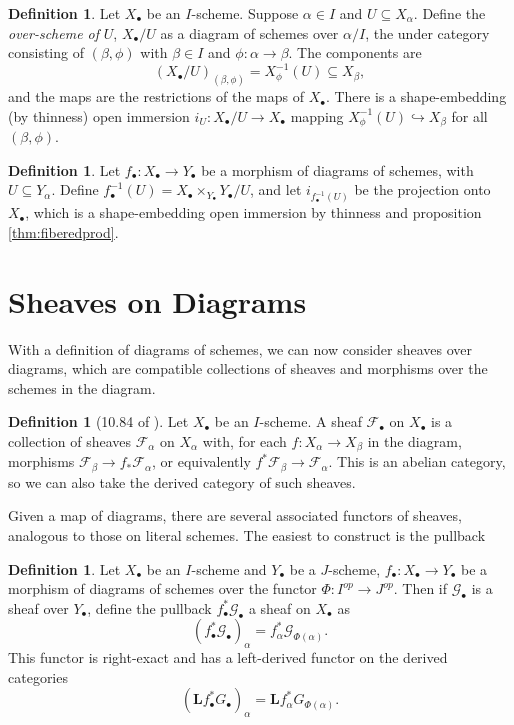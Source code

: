 \documentclass{report}
\theoremstyle{definition}
\newtheorem{definition}[theorem]{Definition}
\newcommand{\FF}{\mathscr{F}}
\newcommand{\GG}{\mathscr{G}}
\newcommand{\bL}{\textbf{L}}
\begin{document}
\begin{definition}
	Let $X_\bullet$ be an $I$-scheme.
	Suppose $\alpha \in I$ and $U \subseteq X_\alpha$.
	Define the {\it over-scheme of} $U$, $X_\bullet/U$ as a diagram of schemes over $\alpha/I$, the under category consisting of $(\beta, \phi)$ with $\beta \in I$ and $\phi : \alpha \rightarrow \beta$.
	The components are
	\[
	(X_\bullet/U)_{(\beta, \phi)} = X_\phi^{-1} (U) \subseteq X_\beta,
	\]
	and the maps are the restrictions of the maps of $X_\bullet$.
	There is a shape-embedding (by thinness) open immersion $i_U : X_\bullet / U \rightarrow X_\bullet$ mapping $X_\phi^{-1}(U) \hookrightarrow X_\beta$ for all $(\beta, \phi)$.
\end{definition}

\begin{definition}
	\label{def:diagrampreimage}
	Let $f_\bullet : X_\bullet \rightarrow Y_\bullet$ be a morphism of diagrams of schemes, with $U \subseteq Y_\alpha$.
	Define $f_\bullet^{-1}(U) = X_\bullet \times_{Y_\bullet} Y_\bullet / U$, and let $i_{f_\bullet^{-1} (U)}$ be the projection onto $X_\bullet$, which is a shape-embedding open immersion by thinness and proposition \ref{thm:fiberedprod}.
\end{definition}

\section{Sheaves on Diagrams}
With a definition of diagrams of schemes, we can now consider sheaves over diagrams, which are compatible collections of sheaves and morphisms over the schemes in the diagram.

\begin{definition}[10.84 of \cite{Kollar2013}]
	Let $X_\bullet$ be an $I$-scheme.
	A sheaf $\FF_\bullet$ on $X_\bullet$ is a collection of sheaves $\FF_\alpha$ on $X_\alpha$ with, for each $f : X_\alpha \rightarrow X_\beta$ in the diagram, morphisms $\FF_\beta \rightarrow f_* \FF_\alpha$, or equivalently $f^* \FF_\beta \rightarrow \FF_\alpha$.
	This is an abelian category, so we can also take the derived category of such sheaves.
\end{definition}

Given a map of diagrams, there are several associated functors of sheaves, analogous to those on literal schemes.
The easiest to construct is the pullback

\begin{definition}
	Let $X_\bullet$ be an $I$-scheme and $Y_\bullet$ be a $J$-scheme, $f_\bullet : X_\bullet \rightarrow Y_\bullet$ be a morphism of diagrams of schemes over the functor $\Phi : I^{op} \rightarrow J^{op}$.
	Then if $\GG_\bullet$ is a sheaf over $Y_\bullet$, define the pullback $f^*_\bullet \GG_\bullet$ a sheaf on $X_\bullet$ as
	\[
	(f^*_\bullet \GG_\bullet)_\alpha = f_\alpha^* \GG_{\Phi(\alpha)}.
	\]
	This functor is right-exact and has a left-derived functor on the derived categories
	\[
	(\bL f^*_\bullet G_\bullet)_\alpha = \bL f_\alpha^* G_{\Phi(\alpha)}.
	\]
\end{definition}
\end{document}
